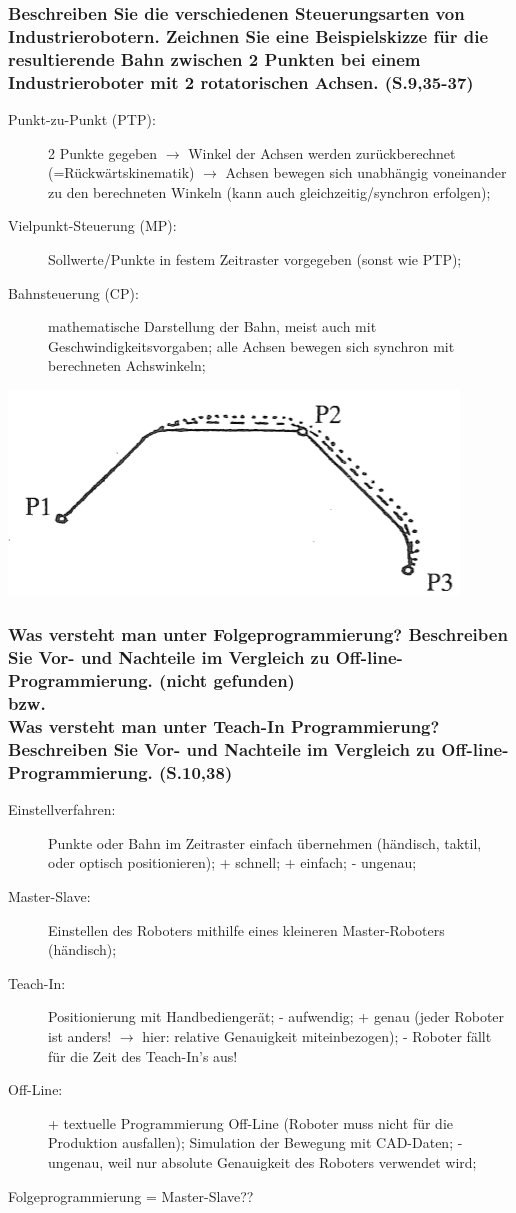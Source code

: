 \documentclass[12pt,a4paper,titlepage,oneside]{article}
\begin{document}
\subsubsection*{Beschreiben Sie die verschiedenen Steuerungsarten von Industrierobotern. Zeichnen
  Sie eine Beispielskizze für die resultierende Bahn zwischen 2 Punkten bei einem 
  Industrieroboter mit 2 rotatorischen Achsen. (S.9,35-37)}
\begin{description}
\item[Punkt-zu-Punkt (PTP):] 2 Punkte gegeben $\rightarrow$ Winkel der Achsen werden 
  zurückberechnet (=Rückwärtskinematik) $\rightarrow$ Achsen bewegen sich unabhängig 
  voneinander zu den berechneten Winkeln (kann auch gleichzeitig/synchron erfolgen);
\item[Vielpunkt-Steuerung (MP):] Sollwerte/Punkte in festem Zeitraster vorgegeben (sonst
  wie PTP);
\item[Bahnsteuerung (CP):] mathematische Darstellung der Bahn, meist auch mit 
  Geschwindigkeitsvorgaben; alle Achsen bewegen sich synchron mit berechneten Achswinkeln;
\end{description}
\includegraphics[width=.4\textwidth]{pics/ptp_bsp}

\subsubsection*{Was versteht man unter Folgeprogrammierung? Beschreiben Sie Vor- und Nachteile
  im Vergleich zu Off-line-Programmierung. (nicht gefunden) \\ bzw. \\
  Was versteht man unter Teach-In Programmierung? Beschreiben Sie Vor- und Nachteile im 
  Vergleich zu Off-line-Programmierung. (S.10,38)}
\begin{description}
\item[Einstellverfahren:] Punkte oder Bahn im Zeitraster einfach übernehmen (händisch, taktil,
  oder optisch positionieren); + schnell; + einfach; - ungenau;
\item[Master-Slave:] Einstellen des Roboters mithilfe eines kleineren Master-Roboters 
  (händisch); 
\item[Teach-In:] Positionierung mit Handbediengerät; 
  - aufwendig; + genau (jeder Roboter ist anders! $\rightarrow$ hier: relative
  Genauigkeit miteinbezogen); - Roboter fällt für die Zeit des Teach-In's aus!
\item[Off-Line:] + textuelle Programmierung Off-Line (Roboter muss nicht für die Produktion 
  ausfallen); Simulation der Bewegung mit CAD-Daten; - ungenau, weil nur absolute Genauigkeit 
  des Roboters verwendet wird;
\end{description}
Folgeprogrammierung = Master-Slave??
\end{document}
